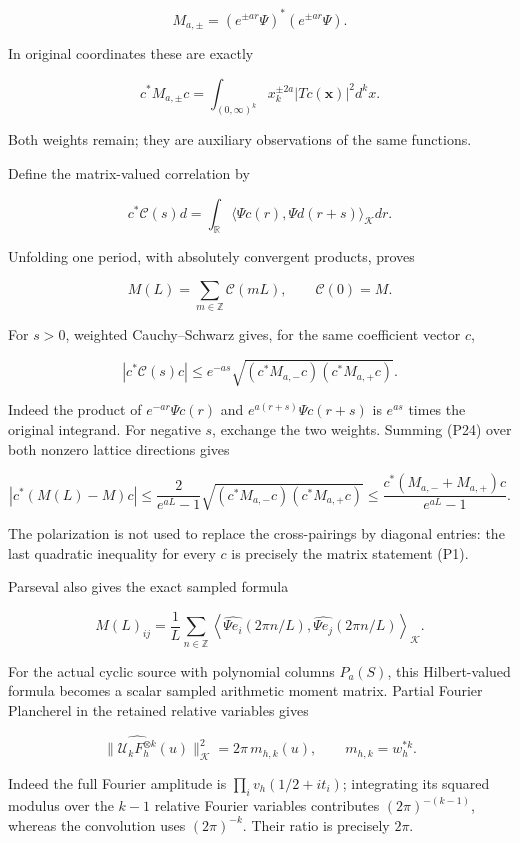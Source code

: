 \[
M_{a,\pm}=(e^{\pm ar}\Psi)^*(e^{\pm ar}\Psi).
\tag{P20}
\]

In original coordinates these are exactly

\[
c^*M_{a,\pm}c=\int_{(0,\infty)^k}x_k^{\pm2a}|Tc(\mathbf x)|^2d^kx.
\tag{P21}
\]

Both weights remain; they are auxiliary observations of the same functions.

Define the matrix-valued correlation by

\[
c^*\mathcal C(s)d
=\int_{\mathbb R}\langle\Psi c(r),\Psi d(r+s)\rangle_{\mathcal K}dr.
\tag{P22}
\]

Unfolding one period, with absolutely convergent products, proves

\[
M(L)=\sum_{m\in\mathbb Z}\mathcal C(mL),\qquad \mathcal C(0)=M.
\tag{P23}
\]

For \(s>0\), weighted Cauchy--Schwarz gives, for the same coefficient vector \(c\),

\[
|c^*\mathcal C(s)c|
\le e^{-as}
\sqrt{(c^*M_{a,-}c)(c^*M_{a,+}c)}.
\tag{P24}
\]

Indeed the product of \(e^{-ar}\Psi c(r)\) and \(e^{a(r+s)}\Psi c(r+s)\) is \(e^{as}\) times the original integrand. For negative \(s\), exchange the two weights. Summing (P24) over both nonzero lattice directions gives

\[
|c^*(M(L)-M)c|
\le\frac{2}{e^{aL}-1}
\sqrt{(c^*M_{a,-}c)(c^*M_{a,+}c)}
\le\frac{c^*(M_{a,-}+M_{a,+})c}{e^{aL}-1}.
\tag{P25}
\]

The polarization is not used to replace the cross-pairings by diagonal entries: the last quadratic inequality for every \(c\) is precisely the matrix statement (P1).

Parseval also gives the exact sampled formula

\[
M(L)_{ij}
=\frac1L\sum_{n\in\mathbb Z}
\left\langle\widehat{\Psi e_i}(2\pi n/L),
\widehat{\Psi e_j}(2\pi n/L)\right\rangle_{\mathcal K}.
\tag{P26}
\]

For the actual cyclic source with polynomial columns \(P_a(S)\), this Hilbert-valued formula becomes a scalar sampled arithmetic moment matrix. Partial Fourier Plancherel in the retained relative variables gives

\[
\|\widehat{\mathcal U_kF_h^{\otimes k}}(u)\|_{\mathcal K}^2
=2\pi\,m_{h,k}(u),\qquad m_{h,k}=w_h^{*k}.
\tag{P26a}
\]

Indeed the full Fourier amplitude is \(\prod_i v_h(1/2+it_i)\); integrating its squared modulus over the \(k-1\) relative Fourier variables contributes \((2\pi)^{-(k-1)}\), whereas the convolution uses \((2\pi)^{-k}\). Their ratio is precisely \(2\pi\).

